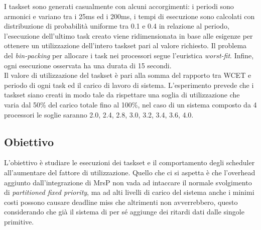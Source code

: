 I taskset sono generati casualmente con alcuni accorgimenti: i periodi sono armonici e variano tra i 25ms ed i 200ms, i tempi di esecuzione sono calcolati con distribuzione di probabilità uniforme tra 0.1 e 0.4 in relazione al periodo, l'esecuzione dell'ultimo task creato viene ridimensionata in base alle esigenze per ottenere un utilizzazione dell'intero taskset pari al valore richiesto. Il problema del \textit{bin-packing} per allocare i task nei processori segue l'euristica \textit{worst-fit}. Infine, ogni esecuzione osservata ha una durata di 15 secondi.\\

Il valore di utilizzazione del taskset è pari alla somma del rapporto tra WCET e periodo di ogni task ed il carico di lavoro di sistema. L'esperimento prevede che i taskset siano creati in modo tale da rispettare una soglia di utilizzazione che varia dal 50\% del carico totale fino al 100\%, nel caso di un sistema composto da 4 processori le soglie saranno 2.0, 2.4, 2.8, 3.0, 3.2, 3.4, 3.6, 4.0.

\subsection{Obiettivo}
\label{sec:confronto_norisorsa_ob}

L'obiettivo è studiare le esecuzioni dei taskset e il comportamento degli scheduler all'aumentare del fattore di utilizzazione. Quello che ci si aspetta è che l'overhead aggiunto dall'integrazione di MrsP non vada ad intaccare il normale svolgimento di \textit{partitioned fixed priority}, ma ad alti livelli di carico del sistema anche i minimi costi possono causare deadline miss che altrimenti non avverrebbero, questo considerando che già il sistema di per sé aggiunge dei ritardi dati dalle singole primitive.\\



